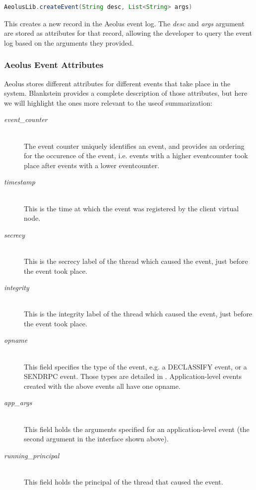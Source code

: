 \begin{lstlisting}[language=Java, label=app-logging]
AeolusLib.createEvent(String desc, List<String> args)
\end{lstlisting}

This creates a new record in the Aeolus event log. The \emph{desc} and \emph{args} argument are stored as attributes for that record, allowing the developer to query the event log based on the arguments they provided.

\subsubsection{Aeolus Event Attributes}

Aeolus stores different attributes for different events that take place in the system. Blankstein \cite{blanks} provides a complete description of those attributes, but here we will highlight the ones more relevant to the useof summarization:

\begin{description}
  \item[\emph{event\_counter}] \ \\
    The event counter uniquely identifies an event, and provides an
    ordering for the occurence of the event, i.e. events with a higher 
    eventcounter took place after events with a lower eventcounter.
  \item[\emph{timestamp}] \ \\
    This is the time at which the event was registered 
    by the client virtual node.
  \item[\emph{secrecy}] \ \\
    This is the secrecy label of the thread which caused the event, 
    just before the event took place.
  \item[\emph{integrity}] \ \\
    This is the integrity label of the thread which caused the event, 
    just before the event took place.
  \item[\emph{opname}] \ \\
    This field specifies the type of the event, e.g. a DECLASSIFY event, 
    or a SENDRPC event. Those types are detailed in \cite{blanks}.
    Application-level events created with the above events
    all have one opname.
  \item[\emph{app\_args}] \ \\
    This field holds the arguments specified for an application-level 
    event (the second argument in the interface shown above).
  \item[\emph{running\_principal}] \ \\
    This field holds the principal of the thread that caused the event.
\end{description}

